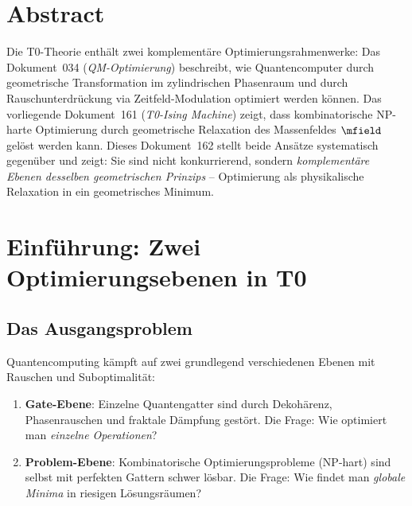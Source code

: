 
\section*{Abstract}

Die T0-Theorie enthält zwei komplementäre Optimierungsrahmenwerke: Das Dokument~034
(\emph{QM-Optimierung}) beschreibt, wie Quantencomputer durch geometrische Transformation
im zylindrischen Phasenraum und durch Rauschunterdrückung via Zeitfeld-Modulation
optimiert werden können. Das vorliegende Dokument~161 (\emph{T0-Ising Machine}) zeigt,
dass kombinatorische NP-harte Optimierung durch geometrische Relaxation des Massenfeldes
$\mfield$ gelöst werden kann. Dieses Dokument~162 stellt beide Ansätze systematisch
gegenüber und zeigt: Sie sind nicht konkurrierend, sondern \emph{komplementäre Ebenen
desselben geometrischen Prinzips} -- Optimierung als physikalische Relaxation in ein
geometrisches Minimum.

\clearpage

\section{Einführung: Zwei Optimierungsebenen in T0}
\label{sec:intro}

\subsection{Das Ausgangsproblem}

Quantencomputing kämpft auf zwei grundlegend verschiedenen Ebenen mit Rauschen und
Suboptimalität:

\begin{enumerate}
    \item \textbf{Gate-Ebene}: Einzelne Quantengatter sind durch Dekohärenz, Phasenrauschen
    und fraktale Dämpfung gestört. Die Frage: Wie optimiert man \emph{einzelne Operationen}?

    \item \textbf{Problem-Ebene}: Kombinatorische Optimierungsprobleme (NP-hart) sind
    selbst mit perfekten Gattern schwer lösbar. Die Frage: Wie findet man
    \emph{globale Minima} in riesigen Lösungsräumen?
\end{enumerate}

